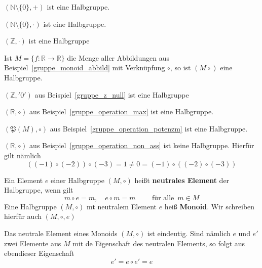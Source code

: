 \begin{beispiel} $(\mathbb N \setminus \{ 0 \}, +)$ ist eine Halbgruppe. \end{beispiel}

\begin{beispiel} $(\mathbb N \setminus \{ 0 \}, \cdot)$ ist eine Halbgruppe. \end{beispiel}

\begin{beispiel} $(\mathbb Z, \cdot)$ ist eine Halbgruppe \end{beispiel}

\begin{beispiel} Ist $M = \{f: \mathbb R \longrightarrow \mathbb R \}$ die Menge aller Abbildungen aus 
Beispiel~\ref{gruppe_monoid_abbild} mit Verknüpfung $\circ$, so ist $(M \circ)$ eine Halbgruppe.
\end{beispiel}

\begin{beispiel} $(\mathbb Z, '0')$ aus Beispiel~\ref{gruppe_z_null} ist eine Halbgruppe \end{beispiel}

\begin{beispiel} $(\mathbb R, \circ)$ aus Beispiel~\ref{gruppe_operation_max} ist eine Halbgruppe.
\end{beispiel}

\begin{beispiel} $(\mathfrak{P}(M), \circ)$ aus Beispiel~\ref{gruppe_operation_potenzm} ist eine 
Halbgruppe.
\end{beispiel}

\begin{beispiel} $(\mathbb R, \circ)$ aus Beispiel~\ref{gruppe_operation_non_ass} ist keine Halbgruppe. 
Hierfür gilt nämlich
  	$$ ((-1) \circ (-2)) \circ(-3) = 1 \neq 0 = (-1) \circ ((-2) \circ (-3)) $$
\end{beispiel}

\begin{definition} Ein Element $e$ einer Halbgruppe $(M, \circ)$ heißt 
\textbf{neutrales Element} der Halbgruppe, wenn gilt 
  	$$ m \circ e = m, \quad e \circ m = m \qquad \textrm{ für alle }\, m \in M $$
Eine Halbgruppe $(M, \circ)$ mt neutralem Element $e$ heiß \textbf{Monoid}. Wir 
schreiben hierfür auch $(M, \circ, e)$
\end{definition}

\begin{notiz} Das neutrale Element eines Monoids $(M,\circ)$ ist eindeutig. Sind nämlich $e$ und $e'$ zwei 
Elemente aus $M$ mit de Eigenschaft des neutralen Elements, so folgt aus ebendieser Eigenschaft
  	$$ e' = e \circ e' = e $$
\end{notiz}

